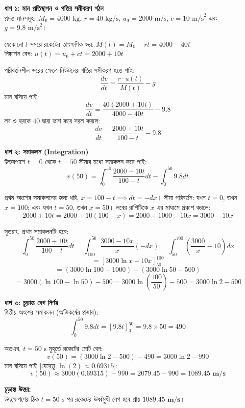 \documentclass[12pt, a4paper]{article}
\begin{document}
\begin{tcolorbox}[solutionbox={সমাধান (Solution)}]
\noindent
\textbf{ধাপ ১: মান প্রতিস্থাপন ও গতির সমীকরণ গঠন} \\
প্রদত্ত মানসমূহ: $M_0 = 4000\text{ kg}$, $r = 40\text{ kg/s}$, $u_0 = 2000\text{ m/s}$, $c = 10\text{ m/s}^2$ এবং $g = 9.8\text{ m/s}^2$।

যেকোনো $t$ সময়ে রকেটের তাৎক্ষণিক ভর: $M(t) = M_0 - rt = 4000 - 40t$ \\
নিষ্কাশন বেগ: $u(t) = u_0 + ct = 2000 + 10t$

পরিবর্তনশীল ভরের ক্ষেত্রে নিউটনের গতির সমীকরণ হতে পাই:
$$\frac{dv}{dt} = \frac{r \cdot u(t)}{M(t)} - g$$
মান বসিয়ে পাই:
$$\frac{dv}{dt} = \frac{40(2000 + 10t)}{4000 - 40t} - 9.8$$ 
লব ও হরকে $40$ দ্বারা ভাগ করে সরল করলে:
$$\frac{dv}{dt} = \frac{2000 + 10t}{100 - t} - 9.8$$

\vspace{0.5em}
\noindent
\textbf{ধাপ ২: সমাকলন (Integration)} \\
উভয়পাশে $t=0$ থেকে $t=50$ সীমার মধ্যে সমাকলন করে পাই:
$$v(50) = \int_{0}^{50} \frac{2000 + 10t}{100 - t} dt - \int_{0}^{50} 9.8 dt$$

প্রথম অংশের সমাকলনের জন্য ধরি, $x = 100 - t \implies dt = -dx$। 
সীমা পরিবর্তন: যখন $t = 0$, তখন $x = 100$; এবং যখন $t = 50$, তখন $x = 50$।
লবের রাশিটিকে $x$ এর মাধ্যমে প্রকাশ করলে: 
$$2000 + 10t = 2000 + 10(100 - x) = 2000 + 1000 - 10x = 3000 - 10x$$

সুতরাং, প্রথম সমাকলনটি হবে:
$$\int_{0}^{50} \frac{2000 + 10t}{100 - t} dt = \int_{100}^{50} \frac{3000 - 10x}{x} (-dx) = \int_{50}^{100} \left( \frac{3000}{x} - 10 \right) dx$$
$$= \left[ 3000 \ln x - 10x \right]_{50}^{100}$$
$$= (3000 \ln 100 - 1000) - (3000 \ln 50 - 500)$$
$$= 3000 (\ln 100 - \ln 50) - 500 = 3000 \ln\left(\frac{100}{50}\right) - 500 = 3000 \ln 2 - 500$$

\vspace{0.5em}
\noindent
\textbf{ধাপ ৩: চূড়ান্ত বেগ নির্ণয়} \\
দ্বিতীয় অংশের সমাকলন (অভিকর্ষের প্রভাব):
$$\int_{0}^{50} 9.8 dt = \left[ 9.8t \right]_{0}^{50} = 9.8 \times 50 = 490$$

অতএব, $t = 50\text{ s}$ মুহূর্তে রকেটের মোট বেগ:
$$v(50) = (3000 \ln 2 - 500) - 490 = 3000 \ln 2 - 990$$ 
মান বসিয়ে পাই [যেহেতু $\ln(2) \approx 0.69315$]:
$$v(50) \approx 3000(0.69315) - 990 = 2079.45 - 990 = \mathbf{1089.45\text{ m/s}}$$

\vspace{1em}
\begin{tcolorbox}[answerbox]
\textbf{চূড়ান্ত উত্তর:} \\
উৎক্ষেপণের ঠিক $t = 50\text{ s}$ পর রকেটের ঊর্ধ্বমুখী বেগ হবে প্রায় $\mathbf{1089.45\text{ m/s}}$।
\end{tcolorbox}
\end{tcolorbox}
\end{document}
